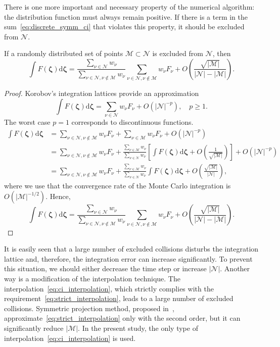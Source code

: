 \documentclass[]{jfm}
\newcommand{\dd}{\mathrm{d}}
\newcommand{\dzeta}{\boldsymbol{\dd\zeta}}
\newcommand{\bzeta}{\boldsymbol{\zeta}}
\newcommand{\Nu}{\mathcal{N}}
\newcommand{\Mu}{\mathcal{M}}
\newcommand{\OO}[1]{O\left(#1\right)}
\begin{document}
There is one more important and necessary property of the numerical algorithm:
the distribution function must always remain positive.
If there is a term in the sum~\eqref{eq:discrete_symm_ci} that violates this property,
it should be excluded from \(\Nu\).
\begin{lemma}
    If a randomly distributed set of points \(\Mu\subset\Nu\) is excluded from \(\Nu\), then
    \begin{equation*}
        \int F(\bzeta) \dzeta = \frac{\sum_{\nu\in\Nu} w_\nu}{\sum_{\nu\in\Nu,\nu\notin\Mu} w_\nu}
            \sum_{\nu\in\Nu,\nu\notin\Mu} w_\nu F_\nu + \OO{\frac{\sqrt{|\Mu|}}{|\Nu|-|\Mu|}}.
    \end{equation*}
\end{lemma}

\begin{proof}

Korobov's integration lattices provide an approximation
\begin{equation*}
    \int F(\bzeta) \dzeta = \sum_{\nu\in\Nu} w_\nu F_\nu + \OO{|\Nu|^{-p}}, \quad p\geq1.
\end{equation*}
The worst case \(p=1\) corresponds to discontinuous functions.
\begin{align*}
    \int F(\bzeta) \dzeta &= \sum_{\nu\in\Nu,\nu\notin\Mu} w_\nu F_\nu
        + \sum_{\nu\in\Mu} w_\nu F_\nu + \OO{|\Nu|^{-p}} \\
    &= \sum_{\nu\in\Nu,\nu\notin\Mu} w_\nu F_\nu
        + \frac{\sum_{\nu\in\Mu} w_\nu}{\sum_{\nu\in\Nu} w_\nu}
             \left[ \int F(\bzeta) \dzeta + \OO{\frac1{\sqrt{|\Mu|}}} \right]
        + \OO{|\Nu|^{-p}} \\
    &= \sum_{\nu\in\Nu,\nu\notin\Mu} w_\nu F_\nu
        + \frac{\sum_{\nu\in\Mu} w_\nu}{\sum_{\nu\in\Nu} w_\nu} \int F(\bzeta) \dzeta
        + \OO{\frac{\sqrt{|\Mu|}}{|\Nu|}},
\end{align*}
where we use that the convergence rate of the Monte Carlo integration is \(\OO{|\Mu|^{-1/2}}\).
Hence,
\begin{equation*}
    \int F(\bzeta) \dzeta = \frac{\sum_{\nu\in\Nu} w_\nu}{\sum_{\nu\in\Nu,\nu\notin\Mu} w_\nu}
        \sum_{\nu\in\Nu,\nu\notin\Mu} w_\nu F_\nu + \OO{\frac{\sqrt{|\Mu|}}{|\Nu|-|\Mu|}}.
\end{equation*}

\end{proof}

It is easily seen that a large number of excluded collisions disturbs the integration lattice
and, therefore, the integration error can increase significantly.
To prevent this situation, we should either decrease the time step or increase \(|\Nu|\).
Another way is a modification of the interpolation technique.
The interpolation~\eqref{eq:ci_interpolation},
which strictly complies with the requirement~\eqref{eq:strict_interpolation},
leads to a large number of excluded collisions.
Symmetric projection method, proposed in~\citet{Tcheremissine2015},
approximate~\eqref{eq:strict_interpolation} only with the second order,
but it can significantly reduce \(|\Mu|\).
In the present study, the only type of interpolation~\eqref{eq:ci_interpolation} is used.
\end{document}
